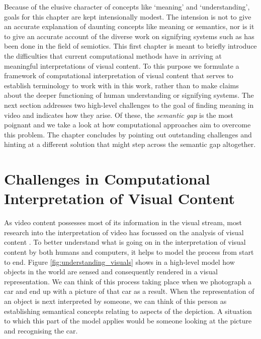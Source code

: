 Because of the elusive character of concepts like `meaning' and `understanding', goals for this chapter are kept intensionally modest. The intension is not to give an accurate explanation of daunting concepts like meaning or semantics, nor is it to give an accurate account of the diverse work on signifying systems such as has been done in the field of semiotics. This first chapter is meant to briefly introduce the difficulties that current computational methods have in arriving at meaningful interpretations of visual content. To this purpose we formulate a framework of computational interpretation of visual content that serves to establish terminology to work with in this work, rather than to make claims about the deeper functioning of human understanding or signifying systems. The next section addresses two high-level challenges to the goal of finding meaning in video and indicates how they arise. Of these, the \emph{semantic gap} is the most poignant and we take a look at how computational approaches aim to overcome this problem. The chapter concludes by pointing out outstanding challenges and hinting at a different solution that might step across the semantic gap altogether.


\section{Challenges in Computational Interpretation of Visual Content} %
\label{sec:challenges_in_interpretation}

As video content possesses most of its information in the visual stream, most research into the interpretation of video has focussed on the analysis of visual content \cite[ch.~2]{Snoek:2009dq}. To better understand what is going on in the interpretation of visual content by both humans and computers, it helps to model the process from start to end. Figure \ref{fig:understanding_visuals} shows in a high-level model how objects in the world are sensed and consequently rendered in a visual representation. We can think of this process taking place when we photograph a car and end up with a picture of that car as a result. When the representation of an object is next interpreted by someone, we can think of this person as establishing semantical concepts relating to aspects of the depiction. A situation to which this part of the model applies would be someone looking at the picture and recognising the car.

